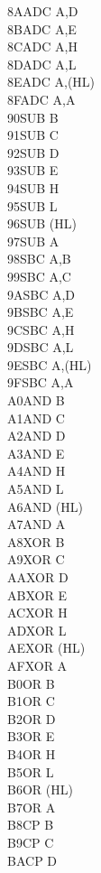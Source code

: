 \documentclass[12pt,twoside,openright,a4paper]{book}
\begin{document}
\begin{multicols}{3}
{\begin{tabbing}
	8A\>ADC A,D\\
	8B\>ADC A,E\\
	8C\>ADC A,H\\
	8D\>ADC A,L\\
	8E\>ADC A,(HL)\\
	8F\>ADC A,A\\
	90\>SUB B\\
	91\>SUB C\\
	92\>SUB D\\
	93\>SUB E\\
	94\>SUB H\\
	95\>SUB L\\
	96\>SUB (HL)\\
	97\>SUB A\\
	98\>SBC A,B\\
	99\>SBC A,C\\
	9A\>SBC A,D\\
	9B\>SBC A,E\\
	9C\>SBC A,H\\
	9D\>SBC A,L\\
	9E\>SBC A,(HL)\\
	9F\>SBC A,A\\
	A0\>AND B\\
	A1\>AND C\\
	A2\>AND D\\
	A3\>AND E\\
	A4\>AND H\\
	A5\>AND L\\
	A6\>AND (HL)\\
	A7\>AND A\\
	A8\>XOR B\\
	A9\>XOR C\\
	AA\>XOR D\\
	AB\>XOR E\\
	AC\>XOR H\\
	AD\>XOR L\\
	AE\>XOR (HL)\\
	AF\>XOR A\\
	B0\>OR B\\
	B1\>OR C\\
	B2\>OR D\\
	B3\>OR E\\
	B4\>OR H\\
	B5\>OR L\\
	B6\>OR (HL)\\
	B7\>OR A\\
	B8\>CP B\\
	B9\>CP C\\
	BA\>CP D\\

\end{tabbing}}
\end{multicols}
\end{document}
